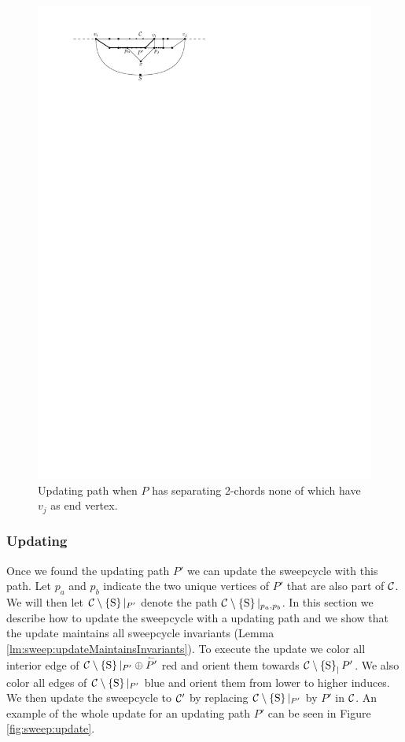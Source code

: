       \begin{figure}[b]
        \centering
        \includegraphics[scale=1]{unifiedAlgo/img/sweep/cases/free2chord}
        \caption{Updating path when $P$ has separating 2-chords none of which have $v_j$ as end vertex.}
        \label{fig:sweep:free2chord}
      \end{figure}

\subsubsection{Updating}
  \label{sss:sweep:update}
  Once we found the updating path $P'$ we can update the sweepcycle with this path.  Let $p_a$ and $p_b$ indicate the two unique vertices of $P'$ that are also part of $\mathcal{C}$. We will then let $\mathcal{C} \setminus \left\lbrace {\mathrm{S}} \right\rbrace|_{P'}$ denote the path $\mathcal{C} \setminus \left\lbrace {\mathrm{S}} \right\rbrace|_{p_a, p_b}$.
  In this section we describe how to update the sweepcycle with a updating path and we show that the update maintains all sweepcycle invariants (Lemma \ref{lm:sweep:updateMaintainsInvariants}).
  To execute the update we color all interior edge of $\mathcal{C} \setminus \left\lbrace {\mathrm{S}} \right\rbrace|_{P'} \oplus \accentset{\leftharpoonup}{P'}$ red and orient them towards $\mathcal{C} \setminus \left\lbrace {\mathrm{S}} \right\rbrace_|{P'}$.
  We also color all edges of $\mathcal{C} \setminus \left\lbrace {\mathrm{S}} \right\rbrace|_{P'}$  blue and orient them from lower to higher induces.
  We then update the sweepcycle to $\mathcal{C}'$ by replacing $\mathcal{C} \setminus \left\lbrace {\mathrm{S}} \right\rbrace|_{P'}$ by $P'$ in $\mathcal{C}$.
  An example of the whole update for an updating path $P'$ can be seen in Figure \ref{fig:sweep:update}.

